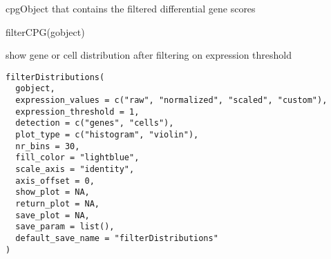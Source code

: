 \documentclass[a4paper]{book}
\begin{document}
%
\begin{Value}
cpgObject that contains the filtered differential gene scores
\end{Value}
%
\begin{Examples}
\begin{ExampleCode}
    filterCPG(gobject)
\end{ExampleCode}
\end{Examples}
%
\begin{Description}\relax
show gene or cell distribution after filtering on expression threshold
\end{Description}
%
\begin{Usage}
\begin{verbatim}
filterDistributions(
  gobject,
  expression_values = c("raw", "normalized", "scaled", "custom"),
  expression_threshold = 1,
  detection = c("genes", "cells"),
  plot_type = c("histogram", "violin"),
  nr_bins = 30,
  fill_color = "lightblue",
  scale_axis = "identity",
  axis_offset = 0,
  show_plot = NA,
  return_plot = NA,
  save_plot = NA,
  save_param = list(),
  default_save_name = "filterDistributions"
)
\end{verbatim}
\end{Usage}
%
\end{document}
